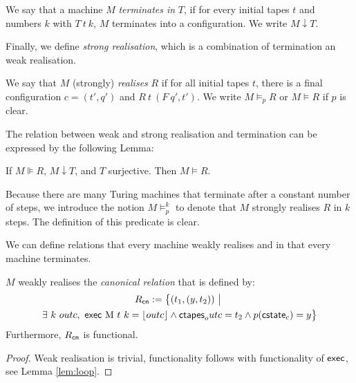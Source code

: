 \documentclass{psartcl}
\begin{document}
\begin{definition}[Termination]
  \label{def:termination}
  We say that a machine $M$ \emph{terminates in} $T$, if for every initial tapes $t$ and numbers $k$ with $T~t~k$,
  $M$ terminates into a configuration.
  We write $M \downarrow T$.
\end{definition}

Finally, we define \emph{strong realisation}, which is a combination of termination an weak realisation.

\begin{definition}
  \label{def:realise}
  We say that $M$ (strongly) \emph{realises} $R$ if for all initial tapes $t$,
  there is a final configuration $c=(t', q')$ and $R~t~(F~q', t')$.
  We write $M \vDash_p R$ or $M \vDash R$ if $p$ is clear.
\end{definition}

The relation between weak and strong realisation and termination can be expressed by the following Lemma:

\begin{lemma}
  \label{lem:wrealise-realise}
  If $M \VDash R$, $M \downarrow T$, and $T$ surjective.  Then $M \vDash R$.
\end{lemma}

Because there are many Turing machines that terminate after a constant number of steps, we introduce the notion $M \vDash_p^k$ to denote that $M$
strongly realises $R$ in $k$ steps.  The definition of this predicate is clear.

We can define relations that every machine weakly realises and in that every machine terminates.

\begin{lemma}
  \label{lem:canonical-relation}
  $M$ weakly realises the \emph{canonical relation} that is defined by:
  \begin{multline*}
    R_{\MS{cn}} := \setMap{(t_1, (y, t_2))}{\\
      \exists~k~outc,~ \MS{exec}~$M$~t~k = \Some{outc} \land \MS{ctapes}_outc = t_2 \land p(\MS{cstate}_c) = y}
    \end{multline*}
    Furthermore, $R_{\textsf{cn}}$ is functional.
\end{lemma}
\begin{proof}
  Weak realisation is trivial, functionality follows with functionality of $\textsf{exec}$, see Lemma \ref{lem:loop}.
\end{proof}
\end{document}
